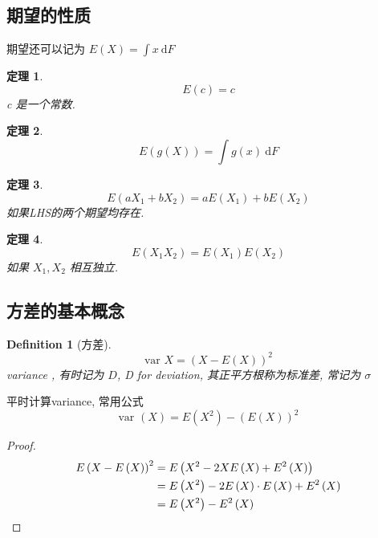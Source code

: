 \documentclass[a4paper, 10pt]{ctexbook} %
\newtheorem{theorem}{定理}
\newtheorem{definition}{Definition}
\begin{document}
    \subsection{期望的性质}
    期望还可以记为 $E \left(X\right) = \int  x \ \mathrm{d} F$
    \begin{theorem}
        \[
        E \left(c\right) =c 
        \] c 是一个常数.
    \end{theorem}
    \begin{theorem}
        \[
        E \left(g \left(X\right)\right) = \int g\left(x\right) \  \mathrm{d} F
        \]
    \end{theorem}
    \begin{theorem}
        \[
        E \left(aX_1 + bX_2\right) = aE\left(X_{1}\right) + bE \left(X _{2}\right)
        \]如果LHS的两个期望均存在. 
    \end{theorem}
    \begin{theorem}
        \[
        E \left(X_{1} X_{2}\right) = E \left(X_{1}\right) E \left(X_2\right)
        \] 如果 $X_{1}, X_{2}$ 相互独立. 
    \end{theorem}
    \subsection{方差的基本概念}
    \begin{definition}[方差]
        \[
        \text{var }X  =\left(X - E\left(X\right)    \right)^{2} 
        \]
    variance , 有时记为 $D$, D for deviation, 其正平方根称为标准差, 常记为 $\sigma$
    \end{definition}
    平时计算variance, 常用公式
    \[
    \text{var }\left(X\right) = E \left(X ^{2}\right) - \left(E \left(X\right)\right) ^{2}
    \]
    \begin{proof}
        \[
        \begin{aligned}
            E \left(X - E \left(X\right)\right)^{2} & = E  \left(X ^{2} - 2 X E \left(X\right) + E ^{2}\left(X\right)\right)\\
            & = E \left(X ^{2}\right) -2  E \left(X\right) \cdot  E \left(X\right) + E ^{2} \left(X\right)\\
            & = E \left(X^{2}\right) - E ^{2} \left(X\right) \qedhere 
        \end{aligned}
        \]
    \end{proof}
\end{document}
